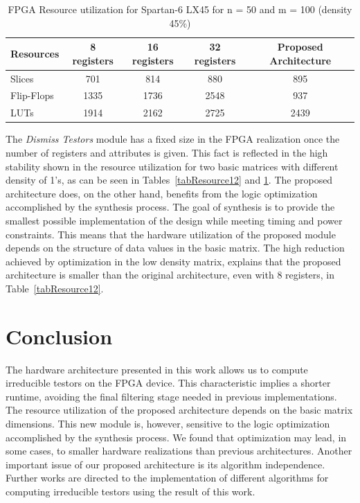 \documentclass[conference]{IEEEtran}
\begin{document}
\begin{table}[htb]
	\renewcommand{\arraystretch}{1.3}
	\caption{FPGA Resource utilization for Spartan-6 LX45 for n = 50 and m = 100 (density 45\%)}
	\label{tabResource45}
	\centering
	\begin{tabular}{lcccc}
	 	\hline                       
	  	Resources & 8 registers & 16 registers & 32 registers & Proposed Architecture\\
	  	\hline
	  	Slices     & 701  & 814  & 880  & 895 \\
	  	Flip-Flops & 1335 & 1736 & 2548 & 937 \\
	  	LUTs       & 1914 & 2162 & 2725 & 2439 \\
	 	\hline 
	\end{tabular}
\end{table}

The \textit{Dismiss Testors} module has a fixed size in the FPGA realization once the number of registers and  attributes is given. This fact is reflected in the high stability shown in the resource utilization for 
two basic matrices with different density of 1's, as can be seen in Tables~\ref{tabResource12} and 
\ref{tabResource45}. The proposed architecture does, on the other hand, benefits from the logic optimization 
accomplished by the synthesis process. The goal of synthesis is to provide the smallest possible implementation 
of the design while meeting timing and power constraints.	 
This means that the hardware utilization of the proposed module depends on the structure of data values in the 
basic matrix. The high reduction achieved by optimization in the low density matrix, explains that the proposed 
architecture is smaller than the original architecture, even with 8 registers, in Table~\ref{tabResource12}.

\section{Conclusion}
\label{sect:8}
The hardware architecture presented in this work allows us to compute irreducible testors on the FPGA 
device. This characteristic implies a shorter runtime, avoiding the final filtering stage needed in previous 
implementations. %
The resource utilization of the proposed architecture depends on the basic matrix dimensions. 
This new module is, however, sensitive to the logic optimization accomplished by the synthesis process. We found 
that optimization may lead, in some cases, to smaller hardware realizations than previous architectures. 
Another important issue of our proposed architecture is its algorithm independence. 
Further works are directed to the implementation of different algorithms for computing irreducible testors using 
the result of this work.
\end{document}

